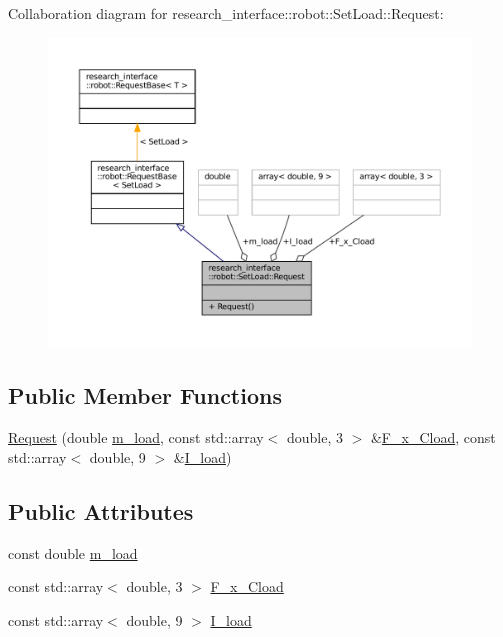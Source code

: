 Collaboration diagram for research\+\_\+interface\+:\+:robot\+:\+:Set\+Load\+:\+:Request\+:
\nopagebreak
\begin{figure}[H]
\begin{center}
\leavevmode
\includegraphics[width=350pt]{structresearch__interface_1_1robot_1_1SetLoad_1_1Request__coll__graph}
\end{center}
\end{figure}
\subsection*{Public Member Functions}
\begin{DoxyCompactItemize}
\item 
\hyperlink{structresearch__interface_1_1robot_1_1SetLoad_1_1Request_ace6c0a8ca9a219463c13e40ef9eb52b4}{Request} (double \hyperlink{structresearch__interface_1_1robot_1_1SetLoad_1_1Request_a448ff490c711178d91f1c96f80c36c1a}{m\+\_\+load}, const std\+::array$<$ double, 3 $>$ \&\hyperlink{structresearch__interface_1_1robot_1_1SetLoad_1_1Request_ad53be7a51f527a2e41572b5563cc184f}{F\+\_\+x\+\_\+\+Cload}, const std\+::array$<$ double, 9 $>$ \&\hyperlink{structresearch__interface_1_1robot_1_1SetLoad_1_1Request_a8f3eee012a9017c0140c10ec2d5f35ca}{I\+\_\+load})
\end{DoxyCompactItemize}
\subsection*{Public Attributes}
\begin{DoxyCompactItemize}
\item 
const double \hyperlink{structresearch__interface_1_1robot_1_1SetLoad_1_1Request_a448ff490c711178d91f1c96f80c36c1a}{m\+\_\+load}
\item 
const std\+::array$<$ double, 3 $>$ \hyperlink{structresearch__interface_1_1robot_1_1SetLoad_1_1Request_ad53be7a51f527a2e41572b5563cc184f}{F\+\_\+x\+\_\+\+Cload}
\item 
const std\+::array$<$ double, 9 $>$ \hyperlink{structresearch__interface_1_1robot_1_1SetLoad_1_1Request_a8f3eee012a9017c0140c10ec2d5f35ca}{I\+\_\+load}
\end{DoxyCompactItemize}



